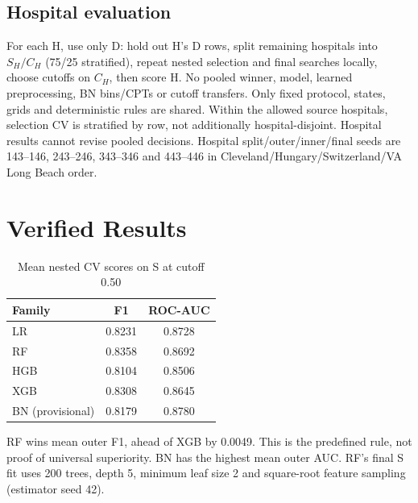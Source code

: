 \documentclass[conference]{IEEEtran}
\begin{document}
\subsection{Hospital evaluation}
For each H, use only D: hold out H's D rows, split remaining hospitals into $S_H/C_H$ (75/25 stratified), repeat nested selection and final searches locally, choose cutoffs on $C_H$, then score H. No pooled winner, model, learned preprocessing, BN bins/CPTs or cutoff transfers. Only fixed protocol, states, grids and deterministic rules are shared. Within the allowed source hospitals, selection CV is stratified by row, not additionally hospital-disjoint. Hospital results cannot revise pooled decisions. Hospital split/outer/inner/final seeds are 143--146, 243--246, 343--346 and 443--446 in Cleveland/Hungary/Switzerland/VA Long Beach order.

\section{Verified Results}
\begin{table}[ht]\centering\caption{Mean nested CV scores on S at cutoff 0.50}
\begin{tabular}{lcc}\toprule Family & F1 & ROC-AUC\\\midrule
LR & 0.8231 & 0.8728\\
RF & 0.8358 & 0.8692\\
HGB & 0.8104 & 0.8506\\
XGB & 0.8308 & 0.8645\\
BN (provisional) & 0.8179 & 0.8780\\
\bottomrule\end{tabular}\end{table}
RF wins mean outer F1, ahead of XGB by 0.0049. This is the predefined rule, not proof of universal superiority. BN has the highest mean outer AUC. RF's final S fit uses 200 trees, depth 5, minimum leaf size 2 and square-root feature sampling (estimator seed 42).
\end{document}
